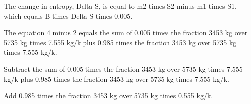 The change in entropy, Delta S, is equal to m2 times S2 minus m1 times S1, which equals B times Delta S times 0.005.

The equation 4 minus 2 equals the sum of 0.005 times the fraction 3453 kg over 5735 kg times 7.555 kg/k plus 0.985 times the fraction 3453 kg over 5735 kg times 7.555 kg/k.

Subtract the sum of 0.005 times the fraction 3453 kg over 5735 kg times 7.555 kg/k plus 0.985 times the fraction 3453 kg over 5735 kg times 7.555 kg/k.

Add 0.985 times the fraction 3453 kg over 5735 kg times 0.555 kg/k.